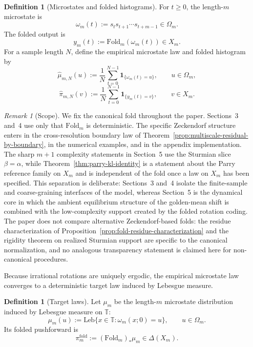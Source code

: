\documentclass[11pt,letterpaper]{article}
\numberwithin{equation}{section}
\theoremstyle{plain}
\theoremstyle{definition}
\newtheorem{definition}[theorem]{Definition}
\theoremstyle{remark}
\newtheorem{remark}[theorem]{Remark}
\newcommand{\TT}{\mathbb{T}}
\newcommand{\Fold}{\mathrm{Fold}}
\newcommand{\leb}{\mathrm{Leb}}
\begin{document}
\begin{definition}[Microstates and folded histograms]
For $t\ge 0$, the length-$m$ microstate is
\[
\omega_m(t):=s_t s_{t+1}\cdots s_{t+m-1}\in\Omega_m.
\]
The folded output is
\[
y_m(t):=\Fold_m(\omega_m(t))\in X_m.
\]
For a sample length $N$, define the empirical microstate law and folded
histogram by
\[
\hat\mu_{m,N}(u):=\frac{1}{N}\sum_{t=0}^{N-1}\mathbf{1}_{\{\omega_m(t)=u\}},
\qquad u\in\Omega_m,
\]
\[
\hat\pi_{m,N}(v):=\frac{1}{N}\sum_{t=0}^{N-1}\mathbf{1}_{\{y_m(t)=v\}},
\qquad v\in X_m.
\]
\end{definition}

\begin{remark}[Scope]\label{rem:scope-fold-assumptions}
We fix the canonical fold throughout the paper. Sections~3 and~4 use only that
\(\Fold_m\) is deterministic. The specific Zeckendorf structure enters in the
cross-resolution boundary law of
Theorem~\ref{prop:multiscale-residual-by-boundary}, in the numerical examples,
and in the appendix implementation. The sharp \(m+1\) complexity statements in
Section~5 use the Sturmian slice \(\beta=\alpha\), while
Theorem~\ref{thm:parry-kl-identity} is a statement about the Parry reference
family on \(X_m\) and is independent of the fold once a law on \(X_m\) has
been specified. This separation is deliberate: Sections~3 and~4 isolate the
finite-sample and coarse-graining interfaces of the model, whereas Section~5 is
the dynamical core in which the ambient equilibrium structure of the
golden-mean shift is combined with the low-complexity support created by the
folded rotation coding.
The paper does not compare alternative Zeckendorf-based folds: the residue
characterization of Proposition~\ref{prop:fold-residue-characterization} and
the rigidity theorem on realized Sturmian support are specific to the canonical
normalization, and no analogous transparency statement is claimed here for
non-canonical procedures.
\end{remark}

Because irrational rotations are uniquely ergodic, the empirical microstate
law converges to a deterministic target law induced by Lebesgue measure.

\begin{definition}[Target laws]
Let $\mu_m$ be the length-$m$ microstate distribution induced by Lebesgue
measure on $\TT$:
\[
\mu_m(u):=\leb\{x\in\TT:\omega_m(x;0)=u\},\qquad u\in\Omega_m.
\]
Its folded pushforward is
\[
\pi_m^{\mathrm{fold}}:=(\Fold_m)_*\mu_m\in\Delta(X_m).
\]
\end{definition}
\end{document}
